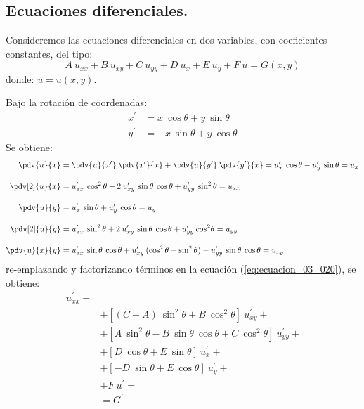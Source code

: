 \subsection{Ecuaciones diferenciales.}
Consideremos las ecuaciones diferenciales en dos variables, con coeficientes constantes, del tipo:
\begin{equation}
A \: u_{xx} + B \: u_{xy} + C \: u_{yy} + D \: u_{x} + E \: u_{y} + F \: u = G(x, y)
\label{eq:ecuacion_03_020}
\end{equation}
donde: $u = u(x, y)$.
\par
Bajo la rotación de coordenadas:
\begin{align*}
x^{\prime} &= x \: \cos \theta + y \: \sin \theta \\
y^{\prime} &= -x \: \sin \theta + y \: \cos \theta
\end{align*}
Se obtiene:
\begin{align*}
\pdv{u}{x} &= \pdv{u}{x^{\prime}} \: \pdv{x^{\prime}}{x} + \pdv{u}{y^{\prime}} \: \pdv{y^{\prime}}{x} = u_{x}^{\prime} \: \cos \theta - u_{y}^{\prime} \: \sin \theta = u_{x} \\[1em]
\pdv[2]{u}{x} &= u_{xx}^{\prime} \: \cos^{2} \theta - 2 \: u_{xy}^{\prime} \: \sin \theta \: \cos \theta + u_{yy}^{\prime} \: \sin^{2} \theta = u_{xx} \\[1em]
\pdv{u}{y} &= u_{x}^{\prime} \: \sin \theta + u_{y}^{\prime} \: \cos \theta = u_{y} \\[1em]
\pdv[2]{u}{y} &= u_{xx}^{\prime} \: \sin^{2} \theta + 2\: u_{xy}^{\prime} \: \sin \theta \: \cos \theta + u_{yy}^{\prime} \: cos^{2} \theta = u_{yy} \\[1em]
\pdv{u}{x}{y} &= u_{xx}^{\prime} \: \sin \theta \: \cos \theta + u_{xy}^{\prime} \: (\cos^{2} \theta - \sin^{2} \theta) - u_{yy}^{\prime} \: \sin \theta \: \cos \theta = u_{xy}
\end{align*}
re-emplazando y factorizando términos en la ecuación (\ref{eq:ecuacion_03_020}), se obtiene:
\begin{align*}
[ A \: \cos^{2} \theta &+ B \: \sin \theta \: \cos \theta + C \: \sin^{2} \theta ] \: u_{xx}^{\prime} + \\
&+ [(C - A) \: \sin^{2} \theta + B \: \cos^{2} \theta ] \: u_{xy}^{\prime} + \\
&+ [A \: \sin^{2} \theta - B \: \sin \theta \: \cos \theta + C \: \cos^{2} \theta ] \: u_{yy}^{\prime} + \\
&+ [ D \: \cos \theta + E \: \sin \theta ] \: u_{x}^{\prime} + \\
&+ [ -D \: \sin \theta + E \: \cos \theta ] \: u_{y}^{\prime} + \\
&+ F \: u^{\prime} =  \\
&= G^{\prime}
\end{align*}
